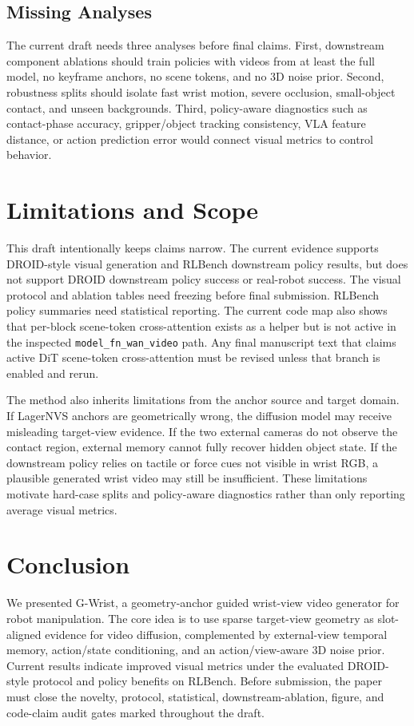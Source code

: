 \documentclass[letterpaper]{article}
\newcommand{\method}{G-Wrist}
\begin{document}
\subsection{Missing Analyses}

The current draft needs three analyses before final claims.
First, downstream component ablations should train policies with videos from at least the full model, no keyframe anchors, no scene tokens, and no 3D noise prior.
Second, robustness splits should isolate fast wrist motion, severe occlusion, small-object contact, and unseen backgrounds.
Third, policy-aware diagnostics such as contact-phase accuracy, gripper/object tracking consistency, VLA feature distance, or action prediction error would connect visual metrics to control behavior.

\section{Limitations and Scope}

This draft intentionally keeps claims narrow.
The current evidence supports DROID-style visual generation and RLBench downstream policy results, but does not support DROID downstream policy success or real-robot success.
The visual protocol and ablation tables need freezing before final submission.
RLBench policy summaries need statistical reporting.
The current code map also shows that per-block scene-token cross-attention exists as a helper but is not active in the inspected \texttt{model\_fn\_wan\_video} path.
Any final manuscript text that claims active DiT scene-token cross-attention must be revised unless that branch is enabled and rerun.

The method also inherits limitations from the anchor source and target domain.
If LagerNVS anchors are geometrically wrong, the diffusion model may receive misleading target-view evidence.
If the two external cameras do not observe the contact region, external memory cannot fully recover hidden object state.
If the downstream policy relies on tactile or force cues not visible in wrist RGB, a plausible generated wrist video may still be insufficient.
These limitations motivate hard-case splits and policy-aware diagnostics rather than only reporting average visual metrics.

\section{Conclusion}

We presented \method, a geometry-anchor guided wrist-view video generator for robot manipulation.
The core idea is to use sparse target-view geometry as slot-aligned evidence for video diffusion, complemented by external-view temporal memory, action/state conditioning, and an action/view-aware 3D noise prior.
Current results indicate improved visual metrics under the evaluated DROID-style protocol and policy benefits on RLBench.
Before submission, the paper must close the novelty, protocol, statistical, downstream-ablation, figure, and code-claim audit gates marked throughout the draft.



% 
\end{document}

